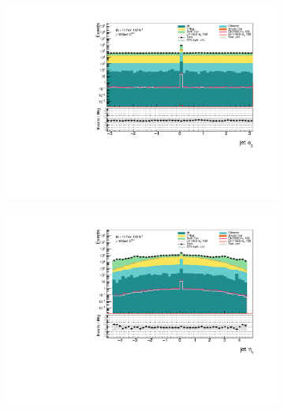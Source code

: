 \documentclass[12pt, a4paper]{book}
\begin{document}
\begin{figure}[!ht]
\begin{subfigure}[b]{0.49\textwidth}
    \end{subfigure}
    \hfill
    \begin{subfigure}[b]{0.49\textwidth}
        \centering
        \includegraphics[width=\textwidth]{phi2_jet.pdf}
    \end{subfigure}
    \begin{subfigure}[b]{0.49\textwidth}
        \centering
        \includegraphics[width=\textwidth]{eta1_jet.pdf}
    \end{subfigure}
    \hfill
    \begin{subfigure}[b]{0.49\textwidth}
        \centering

\end{subfigure}
\end{figure}
\end{document}
